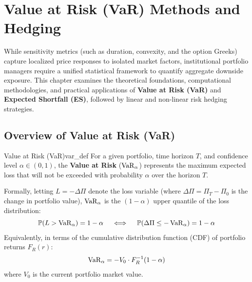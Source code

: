 
\chapter{Value at Risk (VaR) Methods and Hedging}

While sensitivity metrics (such as duration, convexity, and the option Greeks) capture localized price responses to isolated market factors, institutional portfolio managers require a unified statistical framework to quantify aggregate downside exposure. This chapter examines the theoretical foundations, computational methodologies, and practical applications of \textbf{Value at Risk (VaR)} and \textbf{Expected Shortfall (ES)}, followed by linear and non-linear risk hedging strategies.

\section{Overview of Value at Risk (VaR)}

\begin{definition}{Value at Risk (VaR)}{var_def}
For a given portfolio, time horizon $T$, and confidence level $\alpha \in (0, 1)$, the \textbf{Value at Risk} ($\operatorname{VaR}_\alpha$) represents the maximum expected loss that will not be exceeded with probability $\alpha$ over the horizon $T$.

Formally, letting $L = -\Delta \Pi$ denote the loss variable (where $\Delta \Pi = \Pi_T - \Pi_0$ is the change in portfolio value), $\operatorname{VaR}_\alpha$ is the $(1-\alpha)$ upper quantile of the loss distribution:
\begin{equation}
\mathbb{P}(L > \operatorname{VaR}_\alpha) = 1 - \alpha \quad \iff \quad \mathbb{P}(\Delta \Pi \le -\operatorname{VaR}_\alpha) = 1 - \alpha
\end{equation}
Equivalently, in terms of the cumulative distribution function (CDF) of portfolio returns $F_R(r)$:
\begin{equation}
\operatorname{VaR}_\alpha = - V_0 \cdot F_R^{-1}(1 - \alpha)
\end{equation}
where $V_0$ is the current portfolio market value.
\end{definition}


